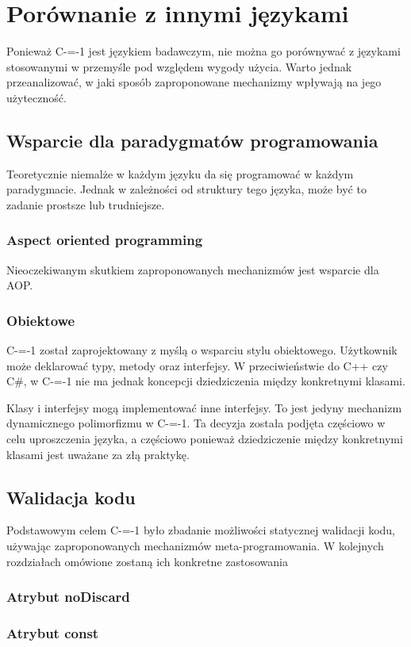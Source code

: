 \section{Porównanie z innymi językami}
Ponieważ C-=-1 jest językiem badawczym, nie można go porównywać z językami stosowanymi w przemyśle pod względem wygody użycia. Warto jednak przeanalizować, w jaki sposób zaproponowane mechanizmy wpływają na jego użyteczność.
\subsection{Wsparcie dla paradygmatów programowania}
Teoretycznie niemalże w każdym języku da się programować w każdym paradygmacie. Jednak w zależności od struktury tego języka, może być to zadanie prostsze lub trudniejsze. 
\subsubsection{Aspect oriented programming}
Nieoczekiwanym skutkiem zaproponowanych mechanizmów jest wsparcie dla AOP.
\subsubsection{Obiektowe}
C-=-1 został zaprojektowany z myślą o wsparciu stylu obiektowego. Użytkownik może deklarować typy, metody oraz interfejsy. W przeciwieństwie do C++ czy C\#, w C-=-1 nie ma jednak koncepcji dziedziczenia między konkretnymi klasami.

Klasy i interfejsy mogą implementować inne interfejsy. To jest jedyny mechanizm dynamicznego polimorfizmu w C-=-1. Ta decyzja została podjęta częściowo w celu uproszczenia języka, a częściowo ponieważ dziedziczenie między konkretnymi klasami jest uważane za złą praktykę.

\subsection{Walidacja kodu}
Podstawowym celem C-=-1 było zbadanie możliwości statycznej walidacji kodu, używając zaproponowanych mechanizmów meta-programowania. W kolejnych rozdziałach omówione zostaną ich konkretne zastosowania 
\subsubsection{Atrybut noDiscard}
\label{no_discard}
\subsubsection{Atrybut const}
\label{const}

